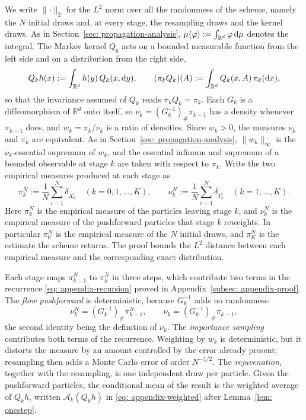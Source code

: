 \documentclass{article}
\begin{document}
We write $\lVert\cdot\rVert_2$ for the $L^2$ norm over all the randomness of the scheme, namely the $N$ initial draws and, at every stage, the resampling draws and the kernel draws. As in Section~\ref{sec: propagation-analysis}, $\mu\langle \varphi\rangle:=\int_{\mathbb R^d}\varphi\,\mathrm{d}\mu$ denotes the integral. The Markov kernel $Q_k$ acts on a bounded measurable function from the left side and on a distribution from the right side,
\begin{equation}
    Q_kh(x) := \int_{\mathbb R^d} h(y)\,Q_k(x,\mathrm{d} y) ,
    \qquad
    (\pi_kQ_k)(A) := \int_{\mathbb R^d} Q_k(x,A)\,\pi_k(\mathrm{d} x) ,
    \label{eq: appendix-kernel}
\end{equation}
so that the invariance assumed of $Q_k$ reads $\pi_kQ_k=\pi_k$. Each $G_k$ is a diffeomorphism of $\mathbb R^d$ onto itself, so $\nu_k=(G_k^{-1})_{\#}\pi_{k-1}$ has a density whenever $\pi_{k-1}$ does, and $w_k=\pi_k/\nu_k$ is a ratio of densities. Since $w_k>0$, the measures $\nu_k$ and $\pi_k$ are equivalent. As in Section~\ref{sec: propagation-analysis}, $\lVert w_k\rVert_\infty$ is the $\nu_k$-essential supremum of $w_k$, and the essential infimum and supremum of a bounded observable at stage $k$ are taken with respect to $\pi_k$. Write the two empirical measures produced at each stage as
\begin{equation}
    \pi_k^N := \frac1N\sum_{i=1}^{N}\delta_{X_k^i}
    \quad (k=0,1,\dots,K),
    \qquad
    \nu_k^N := \frac1N\sum_{i=1}^{N}\delta_{Y_k^i}
    \quad (k=1,\dots,K) .
    \label{eq: appendix-empirical}
\end{equation}
Here $\pi_k^N$ is the empirical measure of the particles leaving stage $k$, and $\nu_k^N$ is the empirical measure of the pushforward particles that stage $k$ reweights. In particular $\pi_0^N$ is the empirical measure of the $N$ initial draws, and $\pi_K^N$ is the estimate the scheme returns. The proof bounds the $L^2$ distance between each empirical measure and the corresponding exact distribution.

Each stage maps $\pi_{k-1}^N$ to $\pi_k^N$ in three steps, which contribute two terms in the recurrence \eqref{eq: appendix-recursion} proved in Appendix~\ref{subsec: appendix-proof}. The \emph{flow pushforward} is deterministic, because $G_k^{-1}$ adds no randomness:
\begin{equation}
    \nu_k^N = (G_k^{-1})_{\#}\pi_{k-1}^N ,
    \qquad
    \nu_k = (G_k^{-1})_{\#}\pi_{k-1} ,
    \label{eq: appendix-pushforward}
\end{equation}
the second identity being the definition of $\nu_k$. The \emph{importance sampling} contributes both terms of the recurrence. Weighting by $w_k$ is deterministic, but it distorts the measure by an amount controlled by the error already present; resampling then adds a Monte Carlo error of order $N^{-1/2}$. The \emph{rejuvenation}, together with the resampling, is one independent draw per particle. Given the pushforward particles, the conditional mean of the result is the weighted average of $Q_kh$, written $\mathcal A_k(Q_kh)$ in \eqref{eq: appendix-weighted} after Lemma~\ref{lem: onestep}.
\end{document}
